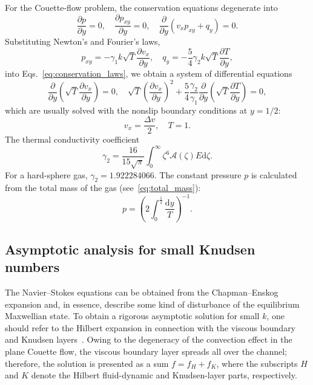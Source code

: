 \documentclass[review]{elsarticle}
\newcommand{\dd}{\mathrm{d}}
\newcommand{\pder}[2][]{\frac{\partial#1}{\partial#2}}
\begin{document}
For the Couette-flow problem, the conservation equations degenerate into
\begin{equation}\label{eq:conservation_laws}
    \pder[p]{y} = 0, \quad \pder[p_{xy}]{y} = 0, \quad \pder{y}(v_x p_{xy} + q_y) = 0.
\end{equation}
Substituting Newton's and Fourier's laws,
\begin{equation}\label{eq:Newton-Fourier}
    p_{xy} = -\gamma_1 k\sqrt{T}\pder[v_x]{y}, \quad q_y = -\frac54\gamma_2 k\sqrt{T}\pder[T]{y},
\end{equation}
into Eqs.~\eqref{eq:conservation_laws}, we obtain a system of differential equations
\begin{equation}\label{eq:Navier-Stokes}
    \pder{y}\left(\sqrt{T}\pder[v_x]{y}\right) = 0, \quad
    \sqrt{T}\left(\pder[v_x]{y}\right)^2 + \frac54\frac{\gamma_2}{\gamma_1}\pder{y}\left(\sqrt{T}\pder[T]{y}\right) = 0,
\end{equation}
which are usually solved with the nonslip boundary conditions at \(y=1/2\):
\begin{equation}\label{eq:nonslip_bc}
    v_x = \frac{\Delta{v}}2, \quad T = 1.
\end{equation}
The thermal conductivity coefficient
\begin{equation}\label{eq:gamma_2}
    \gamma_2 = \frac{16}{15\sqrt{\pi}}\int_0^\infty \zeta^6 \mathcal{A}(\zeta)E\dd\zeta.
\end{equation}
For a hard-sphere gas, \(\gamma_2 = 1.922284066\).
The constant pressure \(p\) is calculated from the total mass of the gas (see~\eqref{eq:total_mass}):
\begin{equation}\label{eq:constant_pressure}
    p = \left( 2\int_{0}^\frac12\frac{\dd{y}}{T} \right)^{-1}.
\end{equation}

\subsection{Asymptotic analysis for small Knudsen numbers}

The Navier--Stokes equations can be obtained from the Chapman--Enskog expansion
and, in essence, describe some kind of disturbance of the equilibrium Maxwellian state.
To obtain a rigorous asymptotic solution for small \(k\),
one should refer to the Hilbert expansion in connection with the
viscous boundary and Knudsen layers~\citep{Sone2000, Sone2002}.
Owing to the degeneracy of the convection effect in the plane Couette flow,
the viscous boundary layer spreads all over the channel;
therefore, the solution is presented as a sum \(f = f_H + f_K\),
where the subscripts \(H\) and \(K\) denote the Hilbert fluid-dynamic and Knudsen-layer parts, respectively.
\end{document}
